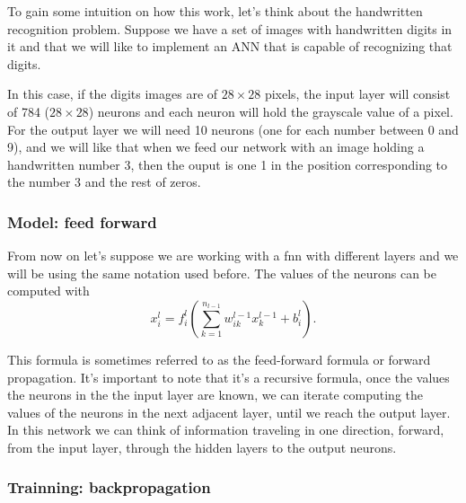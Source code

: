 \begin{exampleBox}
  To gain some intuition on how this work, let's think about the handwritten
  recognition problem. Suppose we have a set of images with handwritten digits
  in it and that we will like to implement an ANN that is capable of
  recognizing that digits.

  In this case, if the digits images are of \(28 \times 28\) pixels, the input
  layer will consist of 784 (\(28 \times 28\)) neurons and each neuron will
  hold the grayscale value of a pixel. For the output layer we will need 10
  neurons (one for each number between 0 and 9), and we will like that when we
  feed our network with an image holding a handwritten number 3, then the ouput
  is one 1 in the position corresponding to the number 3 and the rest of zeros.
\end{exampleBox}

\subsubsection{Model: feed forward}\label{subsec:forward}

From now on let's suppose we are working with a \gls{fnn} with different layers
and we will be using the same notation used before. The values of the neurons
can be computed with
\begin{equation}\label{eq:fnn-forward}
  x_i^l = f_i^l \left(
    \sum_{k=1}^{n_{l-1}} w_{ik}^{l-1} x_{k}^{l-1} + b_i^l
  \right).
\end{equation}

This formula is sometimes referred to as the feed-forward formula or forward
propagation. It's important to note that it's a recursive formula, once the
values the neurons in the the input layer are known, we can iterate computing
the values of the neurons in the next adjacent layer, until we reach the output
layer. In this network we can think of information traveling in one direction,
forward, from the input layer, through the hidden layers to the output neurons.

\subsubsection{Trainning: backpropagation}%
\label{sec:backward}

